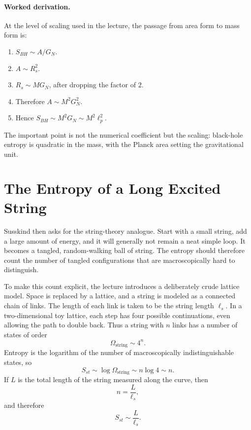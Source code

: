 \paragraph{Worked derivation.}
At the level of scaling used in the lecture, the passage from area form to mass form is:
\begin{enumerate}
\item \(S_{BH}\sim A/G_N\).
\item \(A\sim R_s^2\).
\item \(R_s\sim MG_N\), after dropping the factor of \(2\).
\item Therefore \(A\sim M^2G_N^2\).
\item Hence \(S_{BH}\sim M^2G_N\sim M^2\ell_p^2\).
\end{enumerate}

The important point is not the numerical coefficient but the scaling: black-hole entropy is quadratic in the mass, with the Planck area setting the gravitational unit.

\section{The Entropy of a Long Excited String}

Susskind then asks for the string-theory analogue. Start with a small string, add a large amount of energy, and it will generally not remain a neat simple loop. It becomes a tangled, random-walking ball of string. The entropy should therefore count the number of tangled configurations that are macroscopically hard to distinguish.

To make this count explicit, the lecture introduces a deliberately crude lattice model. Space is replaced by a lattice, and a string is modeled as a connected chain of links. The length of each link is taken to be the string length \(\ell_s\). In a two-dimensional toy lattice, each step has four possible continuations, even allowing the path to double back. Thus a string with \(n\) links has a number of states of order
\begin{equation}
\Omega_{\text{string}}\sim 4^n.
\end{equation}
Entropy is the logarithm of the number of macroscopically indistinguishable states, so
\begin{equation}
S_{st}\sim \log \Omega_{\text{string}}\sim n\log 4 \sim n.
\end{equation}
If \(L\) is the total length of the string measured along the curve, then
\begin{equation}
n=\frac{L}{\ell_s},
\end{equation}
and therefore
\begin{equation}
S_{st}\sim \frac{L}{\ell_s}.
\end{equation}

